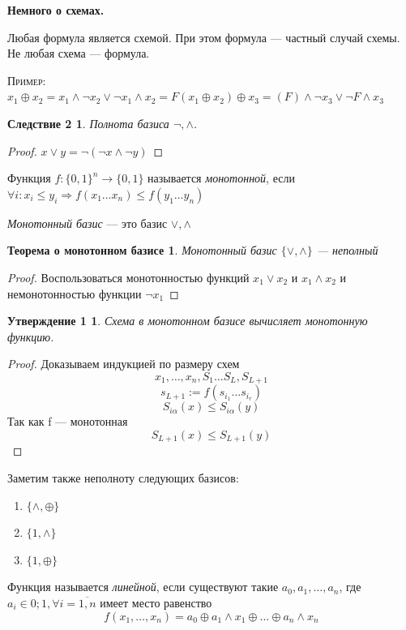 ﻿\documentclass[a4paper, 12pt]{article}
\newtheorem*{sl2}{Следствие 2}
\newtheorem*{monotonousbase}{Теорема о монотонном базисе}
\newtheorem*{scheme}{Утверждение 1}
\begin{document}
\textbf{Немного о схемах.}

Любая формула является схемой. При этом формула --- частный случай схемы. Не любая схема --- формула.

\textsc{Пример: }
$x_1 \oplus x_2 = x_1 \wedge \lnot x_2 \vee \lnot x_1 \wedge x_2 = F
(x_1 \oplus x_2) \oplus x_3 = (F)  \wedge \lnot x_3 \vee \lnot F \wedge x_3$

\begin{sl2}
Полнота базиса {$\lnot, \wedge$}.
\end{sl2}
\begin{proof}
$x \vee y = \lnot (\lnot x \wedge \lnot y)$
\end{proof}
Функция $f:\{0, 1\}^n \rightarrow \{0, 1\}$ называется \textit{монотонной}, если $\forall i: x_i \leqslant y_i \Rightarrow f(x_1 \ldots x_n) \leqslant f(y_1 \ldots y_n)$

\textit{Монотонный базис} --- это базис {$\vee, \wedge$}

\begin{monotonousbase}
Монотонный базис $\{\vee, \wedge\}$ --- неполный
\end{monotonousbase}
\begin{proof}
Воспользоваться монотонностью функций $x_1 \vee x_2$ и $x_1 \wedge x_2$ и немонотонностью функции $\lnot x_1$
\end{proof}
\begin{scheme}
Схема в монотонном базисе вычисляет монотонную функцию.
\end{scheme}
\begin{proof}
Доказываем индукцией по размеру схем
\[x_1, \ldots, x_n, S_1 \ldots S_L, S_{L+1}\] 
\[s_{L+1}:=f(s_{i_1}... s_{i_r})\]
\[S_{i\alpha}(x) \leqslant S_{i\alpha}(y)\]
Так как f --- монотонная
\[S_{L+1}(x) \leqslant S_{L+1}(y)\]
\end{proof}

Заметим также неполноту следующих базисов:
\begin{enumerate}
    \item $\{\wedge,\oplus\}$
    \item $\{1,\wedge\}$
    \item $\{1,\oplus\}$
\end{enumerate}

Функция называется \textit{линейной}, если существуют такие $a_0, a_1, \ldots ,a_n$, где $a_i \in {0;1}, \forall i = \overline{1,n}$ имеет место равенство 
\[f(x_1, \ldots ,x_n) = a_0 \oplus a_1 \wedge x_1 \oplus \ldots \oplus a_n \wedge x_n\]
\end{document}
